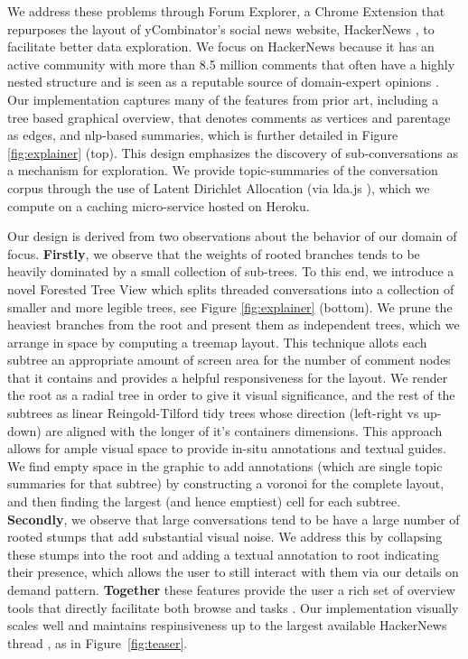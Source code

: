 \documentclass{egpubl}
\begin{document}
We address these problems through Forum Explorer, a Chrome Extension that repurposes the layout of yCombinator's social news website, HackerNews \cite{hackernews}, to facilitate better data exploration.
%
We focus on HackerNews because it has an active community with more than 8.5 million comments that often have a highly nested structure and is seen as a reputable source of domain-expert opinions \cite{barik2015heart}.
%
Our implementation captures many of the features from prior art, including a tree based graphical overview, that denotes comments as vertices and parentage as edges, and nlp-based summaries, which is further detailed in Figure \ref{fig:explainer} (top). 
%
This design emphasizes the discovery of sub-conversations as a mechanism for exploration.
%
We provide topic-summaries of the conversation corpus through the use of Latent Dirichlet Allocation (via lda.js \cite{lda-js}), which we compute on a caching micro-service hosted on Heroku. 



Our design is derived from two observations about the behavior of our domain of focus.
%
%
\textbf{Firstly}, we observe that the weights of rooted branches tends to be heavily dominated by a small collection of sub-trees.
%
To this end, we introduce a novel Forested Tree View which splits threaded conversations into a collection of smaller and more legible trees, see Figure \ref{fig:explainer} (bottom).
%
We prune the heaviest branches from the root and present them as independent trees, which we arrange in space by computing a treemap layout.
%
This technique allots each subtree an appropriate amount of screen area for the number of comment nodes that it contains and provides a helpful responsiveness for the layout.
%
We render the root as a radial tree in order to give it visual significance, and the rest of the subtrees as linear Reingold-Tilford tidy trees whose direction (left-right vs up-down) are aligned with the longer of it's containers dimensions.
%
This approach allows for ample visual space to provide in-situ annotations and textual guides. 
%
We find empty space in the graphic to add annotations (which are single topic summaries for that subtree) by constructing a voronoi for the complete layout, and then finding the largest (and hence emptiest) cell for each subtree.
%
\textbf{Secondly}, we observe that large conversations tend to be have a large number of rooted stumps that add substantial visual noise.
%
We address this by collapsing these stumps into the root and adding a textual annotation to root indicating their presence, which allows the user to still interact with them via our details on demand pattern.
%
\textbf{Together} these features provide the user a rich set of overview tools that directly facilitate both browse and  tasks \cite{brehmer2013multi}.
%
Our implementation visually scales well and maintains respinsiveness up to the largest available HackerNews thread \cite{hackernews-biggest}, as in Figure~\ref{fig:teaser}.
\end{document}
